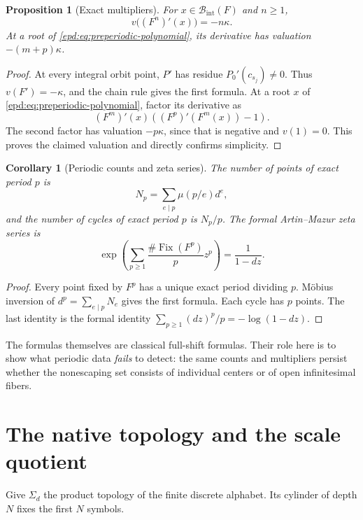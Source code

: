 \documentclass[11pt,a4paper]{article}
\numberwithin{equation}{section}
\theoremstyle{plain}
\newtheorem{proposition}[proposition]{Proposition}
\newtheorem{corollary}[corollary]{Corollary}
\theoremstyle{definition}
\theoremstyle{remark}
\newcommand{\BI}{\mathcal B_{\mathrm{int}}}
\newcommand{\Sig}{\Sigma_d}
\newcommand{\Fix}{\operatorname{Fix}}
\begin{document}
\begin{proposition}[Exact multipliers]\label{epd:prop:multiplier}
For $x\in\BI(F)$ and $n\geq1$,
\[
 v\bigl((F^n)'(x)\bigr)=-n\kappa.
\]
At a root of \eqref{epd:eq:preperiodic-polynomial}, its derivative has
valuation $-(m+p)\kappa$.
\end{proposition}
\begin{proof}
At every integral orbit point, $P'$ has residue $P_0'(c_{s_j})\ne0$.
Thus $v(F')=-\kappa$, and the chain rule gives the first formula.
At a root $x$ of \eqref{epd:eq:preperiodic-polynomial}, factor its derivative
as
\[
 (F^m)'(x)\left((F^p)'(F^m(x))-1\right).
\]
The second factor has valuation $-p\kappa$, since that is negative and
$v(1)=0$. This proves the claimed valuation and directly confirms
simplicity.
\end{proof}

\begin{corollary}[Periodic counts and zeta series]\label{epd:cor:zeta}
The number of points of exact period $p$ is
\[
 N_p=\sum_{e\mid p}\mu(p/e)d^e,
\]
and the number of cycles of exact period $p$ is $N_p/p$. The formal
Artin--Mazur zeta series is
\[
 \exp\!\left(\sum_{p\geq1}\frac{\#\Fix(F^p)}p z^p\right)
 =\frac1{1-dz}.
\]
\end{corollary}
\begin{proof}
Every point fixed by $F^p$ has a unique exact period dividing $p$.
M\"obius inversion of $d^p=\sum_{e\mid p}N_e$ gives the first formula.
Each cycle has $p$ points. The last identity is the formal identity
$\sum_{p\geq1}(dz)^p/p=-\log(1-dz)$.
\end{proof}

The formulas themselves are classical full-shift formulas. Their role
here is to show what periodic data \emph{fails} to detect: the same
counts and multipliers persist whether the nonescaping set consists
of individual centers or of open infinitesimal fibers.

\section{The native topology and the scale quotient}
\label{epd:sec:topology}
Give $\Sig$ the product topology of the finite discrete alphabet.
Its cylinder of depth $N$ fixes the first $N$ symbols.
\end{document}
